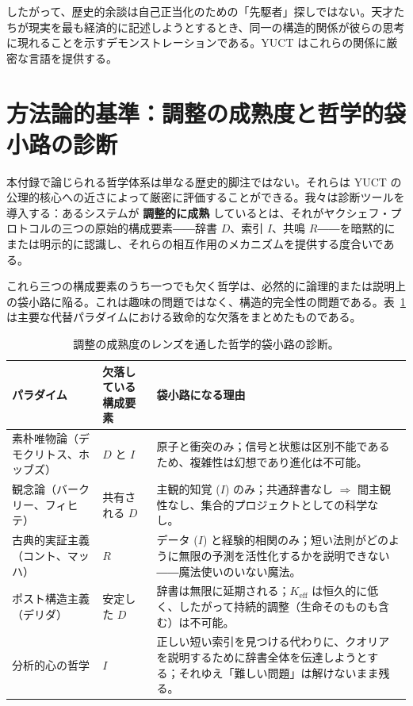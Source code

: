 \documentclass[12pt,a4paper]{article}
\newcommand{\Keff}{K_{\mathrm{eff}}}
\begin{document}
	したがって、歴史的余談は自己正当化のための「先駆者」探しではない。天才たちが現実を最も経済的に記述しようとするとき、同一の構造的関係が彼らの思考に現れることを示すデモンストレーションである。YUCT はこれらの関係に厳密な言語を提供する。
	
	\section{方法論的基準：調整の成熟度と哲学的袋小路の診断}
	\label{sec:methodological-criterion}
	
	本付録で論じられる哲学体系は単なる歴史的脚注ではない。それらは YUCT の公理的核心への近さによって厳密に評価することができる。我々は診断ツールを導入する：あるシステムが \textbf{調整的に成熟} しているとは、それがヤクシェフ・プロトコルの三つの原始的構成要素――辞書 \(D\)、索引 \(I\)、共鳴 \(R\)――を暗黙的にまたは明示的に認識し、それらの相互作用のメカニズムを提供する度合いである。
	
	これら三つの構成要素のうち一つでも欠く哲学は、必然的に論理的または説明上の袋小路に陥る。これは趣味の問題ではなく、構造的完全性の問題である。表~\ref{tab:dead-ends} は主要な代替パラダイムにおける致命的な欠落をまとめたものである。
	
	\begin{table}[htbp]
		\centering
		\caption{調整の成熟度のレンズを通した哲学的袋小路の診断。}
		\label{tab:dead-ends}
		\small
		\begin{tabular}{p{3cm} p{5.5cm} p{5.5cm}}
			\toprule
			\textbf{パラダイム} & \textbf{欠落している構成要素} & \textbf{袋小路になる理由} \\
			\midrule
			素朴唯物論（デモクリトス、ホッブズ） & \(D\) と \(I\) & 原子と衝突のみ；信号と状態は区別不能であるため、複雑性は幻想であり進化は不可能。 \\
			観念論（バークリー、フィヒテ） & 共有される \(D\) & 主観的知覚 (\(I\)) のみ；共通辞書なし \(\Rightarrow\) 間主観性なし、集合的プロジェクトとしての科学なし。 \\
			古典的実証主義（コント、マッハ） & \(R\) & データ (\(I\)) と経験的相関のみ；短い法則がどのように無限の予測を活性化するかを説明できない――魔法使いのいない魔法。 \\
			ポスト構造主義（デリダ） & 安定した \(D\) & 辞書は無限に延期される；\(\Keff\) は恒久的に低く、したがって持続的調整（生命そのものも含む）は不可能。 \\
			分析的心の哲学 & \(I\) & 正しい短い索引を見つける代わりに、クオリアを説明するために辞書全体を伝達しようとする；それゆえ「難しい問題」は解けないまま残る。 \\
			\bottomrule
		\end{tabular}
	\end{table}
	
\end{document}
